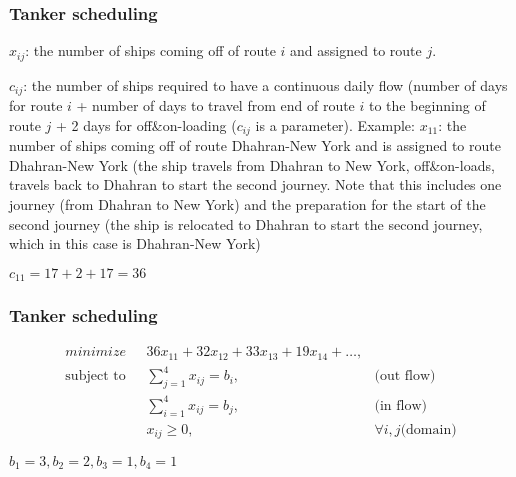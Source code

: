 \documentclass[11pt]{beamer}
\begin{document}
\begin{frame}
\frametitle{Tanker scheduling}
$x_{ij}$: the number of ships coming off of route $i$ and assigned to route $j$.

$c_{ij}$: the number of ships required to have a continuous daily flow (number of days for route $i$ + number of days to travel from end of route $i$ to the beginning of route $j$ + 2 days for off\&on-loading ($c_{ij}$ is a parameter).
\pause
Example:
$x_{11}$: the number of ships coming off of route Dhahran-New York and is assigned to route Dhahran-New York (the ship travels from Dhahran to New York, off\&on-loads, travels back to Dhahran to start the second journey. Note that this includes one journey (from Dhahran to New York) and the preparation for the start of the second journey (the ship is relocated to Dhahran to start the second journey, which in this case is Dhahran-New York)

$c_{11} = 17 + 2 + 17 = 36$
\end{frame}

\begin{frame}
\frametitle{Tanker scheduling}
\begin{align}
\displaystyle minimize \mbox{ } & 36 x_{11} + 32x_{12} + 33 x_{13}+19x_{14} + \ldots, \label{tanker:objective} \\
\mbox{subject to }&\sum_{j=1}^{4} x_{ij} = b_i, & \mbox{(out flow)}  \label{tanker:outflow}\\
&\sum_{i=1}^{4} x_{ij} = b_j, & \mbox{(in flow)}  \label{tanker:inflow}\\
&x_{ij} \geq 0, & \forall i,j  \mbox{(domain)}  \label{tanker:domain}
\end{align}

$b_1 = 3, b_2 = 2, b_3 = 1, b_4 = 1$


\pause
{}
\end{frame}
\end{document}
